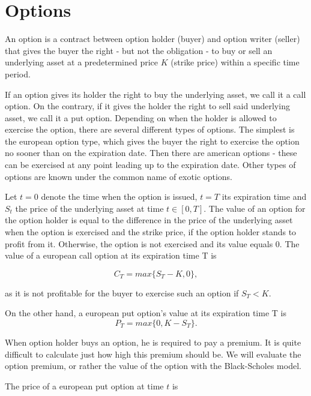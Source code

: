 \documentclass[a4paper, 12pt]{article}
\theoremstyle{definition}
\theoremstyle{plain}
\theoremstyle{definition}
\begin{document}
\section{Options}
\label{ch:options}
An option is a contract between option holder (buyer) 
and option writer (seller) that gives the buyer the right - 
but not the obligation - to buy or sell an underlying asset at a 
predetermined price $K$ (strike price) within a specific 
time period.

If an option gives its holder the right to buy the underlying asset,
we call it a call option. On the contrary, if it gives the holder the 
right to sell said underlying asset, we call it a put option. 
Depending on when the holder is allowed to exercise the option, 
there are several different types of options. 
The simplest is the european option type, which gives the buyer the right to 
exercise the option no sooner than on the expiration date. 
Then there are american options - these can be exercised at any point  
leading up to the expiration date. Other types of options are known 
under the common name of exotic options.

Let $t=0$ denote the time when the option is issued, $t=T$ its expiration time and
$S_t$ the price of the underlying asset at time $t\in[0,T]$.
The value of an option for the option holder is equal to the difference in the 
price of the underlying asset when the option is exercised and the strike price, 
if the option holder stands to profit from it. Otherwise, the option is not exercised 
and its value equals 0. The value of a european call option at its expiration time T is

\begin{equation}
    C_T = max\{S_T-K,0\},
\end{equation}

as it is not profitable for the buyer to exercise such an option if $S_T<K$.

On the other hand, a european put option's value at its expiration time T is
\begin{equation}
    P_T = max\{0, K-S_T\}.
\end{equation}

When option holder buys an option, he is required to pay a premium. 
It is quite difficult to calculate just how high this premium should be.
We will evaluate the option premium, or rather the value of the option
with the Black-Scholes model.

The price of a european put option at time $t$ is
\end{document}
